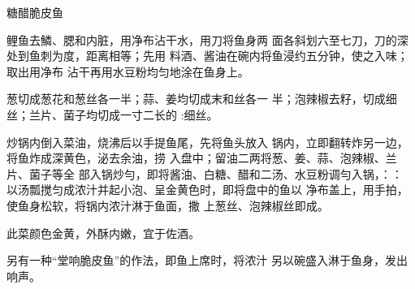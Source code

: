 \begin{recipe}{糖醋脆皮鱼}

\ingredients



\cooking

\step 	鲤鱼去鱗、腮和内脏，用净布沾干水，用刀将鱼身两 面各斜划六至七刀，刀的深处到鱼刺为度，距离相等；先用 料酒、酱油在碗内将鱼浸约五分钟，使之入味；取出用净布 沾干再用水豆粉均匀地涂在鱼身上。

\step 	葱切成葱花和葱丝各一半；蒜、姜均切成末和丝各一 半；泡辣椒去籽，切成细丝；兰片、菌子均切成一寸二长的 :细丝。

\step 	炒锅内倒入菜油，烧沸后以手提鱼尾，先将鱼头放入 锅内，立即翻转炸另一边，将鱼炸成深黄色，泌去余油，捞 入盘中；留油二两将葱、姜、蒜、泡辣椒、兰片、菌子等全 部入锅炒勻，即将酱油、白糖、醋和二汤、水豆粉调勻入锅，：： 以汤瓢搅匀成浓汁并起小泡、呈金黄色时，即将盘中的鱼以 净布盖上，用手拍，使鱼身松软，将锅内浓汁淋于鱼面，撒 上葱丝、泡辣椒丝即成。

\notes

此菜颜色金黄，外酥内嫩，宜于佐酒。

另有一种“堂响脆皮鱼”的作法，即鱼上席时，将浓汁 另以碗盛入淋于鱼身，发出响声。

\end{recipe}


